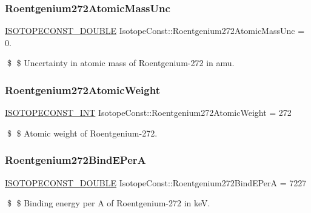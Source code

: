 \subsubsection{\texorpdfstring{Roentgenium272\+Atomic\+Mass\+Unc}{Roentgenium272AtomicMassUnc}}
{\footnotesize\ttfamily \mbox{\hyperlink{group___isotope_const-_macros_ga8f45a7272ce02c0b4c65c44636ed719a}{I\+S\+O\+T\+O\+P\+E\+C\+O\+N\+S\+T\+\_\+\+D\+O\+U\+B\+LE}} Isotope\+Const\+::\+Roentgenium272\+Atomic\+Mass\+Unc = 0.}

\$ \$ Uncertainty in atomic mass of Roentgenium-\/272 in amu. \mbox{\label{group___isotope_const-_roentgenium-_rg272_ga5cd761f9b9034db0b24cbbe4b39e6f8c}} 
\subsubsection{\texorpdfstring{Roentgenium272\+Atomic\+Weight}{Roentgenium272AtomicWeight}}
{\footnotesize\ttfamily \mbox{\hyperlink{group___isotope_const-_macros_ga5f18360b3e99483a35c32d789e62621c}{I\+S\+O\+T\+O\+P\+E\+C\+O\+N\+S\+T\+\_\+\+I\+NT}} Isotope\+Const\+::\+Roentgenium272\+Atomic\+Weight = 272}

\$ \$ Atomic weight of Roentgenium-\/272. \mbox{\label{group___isotope_const-_roentgenium-_rg272_ga46d3b918956194ce446777b598bab95b}} 
\subsubsection{\texorpdfstring{Roentgenium272\+Bind\+E\+PerA}{Roentgenium272BindEPerA}}
{\footnotesize\ttfamily \mbox{\hyperlink{group___isotope_const-_macros_ga8f45a7272ce02c0b4c65c44636ed719a}{I\+S\+O\+T\+O\+P\+E\+C\+O\+N\+S\+T\+\_\+\+D\+O\+U\+B\+LE}} Isotope\+Const\+::\+Roentgenium272\+Bind\+E\+PerA = 7227}

\$ \$ Binding energy per A of Roentgenium-\/272 in keV. \mbox{\label{group___isotope_const-_roentgenium-_rg272_ga658fda778d997b04682d6fed2a9eae9a}} 
